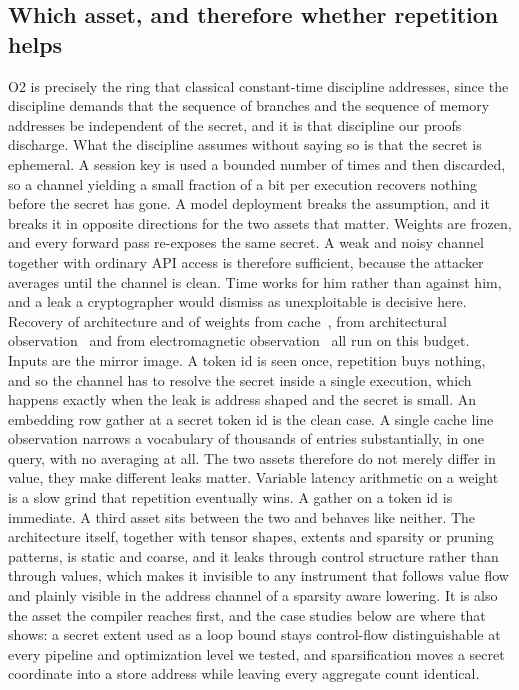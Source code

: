 \subsection{Which asset, and therefore whether repetition helps}
\label{sec:threat:asset}
O2 is precisely the ring that classical constant-time discipline addresses, since the discipline demands that the sequence of branches and the sequence of memory addresses be independent of the secret, and it is that discipline our proofs discharge.
What the discipline assumes without saying so is that the secret is ephemeral.
A session key is used a bounded number of times and then discarded, so a channel yielding a small fraction of a bit per execution recovers nothing before the secret has gone.
A model deployment breaks the assumption, and it breaks it in opposite directions for the two assets that matter.
Weights are frozen, and every forward pass re-exposes the same secret.
A weak and noisy channel together with ordinary API access is therefore sufficient, because the attacker averages until the channel is clean.
Time works for him rather than against him, and a leak a cryptographer would dismiss as unexploitable is decisive here.
Recovery of architecture and of weights from cache~\cite{yan2020cachetelepathy}, from architectural observation~\cite{hu2020deepsniffer} and from electromagnetic observation~\cite{batina2019csinn} all run on this budget.
Inputs are the mirror image.
A token id is seen once, repetition buys nothing, and so the channel has to resolve the secret inside a single execution, which happens exactly when the leak is address shaped and the secret is small.
An embedding row gather at a secret token id is the clean case.
A single cache line observation narrows a vocabulary of thousands of entries substantially, in one query, with no averaging at all.
The two assets therefore do not merely differ in value, they make different leaks matter.
Variable latency arithmetic on a weight is a slow grind that repetition eventually wins.
A gather on a token id is immediate.
A third asset sits between the two and behaves like neither.
The architecture itself, together with tensor shapes, extents and sparsity or pruning patterns, is static and coarse, and it leaks through control structure rather than through values, which makes it invisible to any instrument that follows value flow and plainly visible in the address channel of a sparsity aware lowering.
It is also the asset the compiler reaches first, and the case studies below are where that shows: a secret extent used as a loop bound stays control-flow distinguishable at every pipeline and optimization level we tested, and sparsification moves a secret coordinate into a store address while leaving every aggregate count identical.
